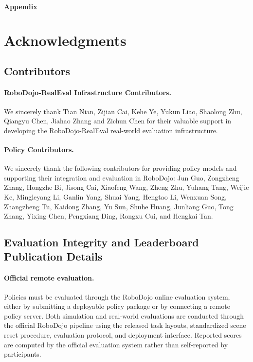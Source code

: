 \newpage

\appendix
{}


\begin{center}
    {\Large\bfseries Appendix}
\end{center}

\section{Acknowledgments}
\label{sec:Acknowledgments}
\subsection{Contributors}

\paragraph{RoboDojo-RealEval Infrastructure Contributors.}
We sincerely thank Tian Nian, Zijian Cai, Kehe Ye, Yukun Liao, Shaolong Zhu, Qiangyu Chen, Jiahao Zhang and Zichun Chen for their valuable support in developing the RoboDojo-RealEval real-world evaluation infrastructure.

\paragraph{Policy Contributors.}
We sincerely thank the following contributors for providing policy models and supporting their integration and evaluation in RoboDojo: Jun Guo, Zongzheng Zhang, Hongzhe Bi, Jisong Cai, Xiaofeng Wang, Zheng Zhu, Yuhang Tang, Weijie Ke, Mingleyang Li, Ganlin Yang, Shuai Yang, Hengtao Li, Wenxuan Song, Zhangzheng Tu, Kaidong Zhang, Yu Sun, Shuhe Huang, Junliang Guo, Tong Zhang, Yixing Chen, Pengxiang Ding, Rongxu Cui, and Hengkai Tan.

\subsection{Evaluation Integrity and Leaderboard Publication Details}
\label{appendix:evaluation_integrity}

\paragraph{Official remote evaluation.}
Policies must be evaluated through the RoboDojo online evaluation system, either by submitting a deployable policy package or by connecting a remote policy server. Both simulation and real-world evaluations are conducted through the official RoboDojo pipeline using the released task layouts, standardized scene reset procedure, evaluation protocol, and deployment interface. Reported scores are computed by the official evaluation system rather than self-reported by participants.

